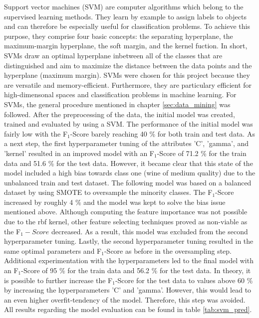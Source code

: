 Support vector machines (SVM) are computer algorithms which belong to the supervised learning methods. They learn by example to assign labels to objects and can therefore be especially useful for classification problems. To achieve this purpose, they comprise four basic concepts: the separating hyperplane, the maximum-margin hyperplane, the soft margin, and the kernel fuction. In short, SVMs draw an optimal hyperplane inbetween all of the classes that are distinguished and aim to maximize the distance between the data points and the hyperplane (maximum margin). \citep{Noble2006}
SVMs were chosen for this project because they are versatile and memory-efficient. Furthermore, they are particulary efficient for high-dimensonal spaces and classification problems in machine learning. \citep{ScikitLearn2021}
For SVMs, the general procedure mentioned in chapter \ref{sec:data_mining} was followed. After the preprocessing of the data, the initial model was created, trained and evaluated by using a SVM. The performance of the initial model was fairly low with the F$_1$-Score barely reaching 40 \% for both train and test data. As a next step, the first hyperparameter tuning of the attributes 'C', 'gamma', and 'kernel' resulted in an improved model with an F$_1$-Score of 71.2 \% for the train data and 51.6 \% for the test data. However, it became clear that this state of the model included a high bias towards class one (wine of medium quality) due to the unbalanced train and test dataset. 
The following model was based on a balanced dataset by using SMOTE to oversample the minority classes. The F$_1$-Score increased by roughly 4 \% and the model was kept to solve the bias issue mentioned above. Although computing the feature importance was not possible due to the rbf kernel, other feature selecting techniques proved as non-viable as the F$_1-Score$ decreased. As a result, this model was excluded from the second hyperparameter tuning. 
Lastly, the second hyperparameter tuning resulted in the same optimal parameters and F$_1$-Score as before in the oversampling step. Additional experimentation with the hyperparameters led to the final model with an F$_1$-Score of 95 \% for the train data and 56.2 \% for the test data. In theory, it is possible to further increase the F$_1$-Score for the test data to values above 60 \% by increasing the hyperparameters 'C' and 'gamma'. However, this would lead to an even higher overfit-tendency of the model. Therefore, this step was avoided. All results regarding the model evaluation can be found in table \ref{tab:svm_pred}.


